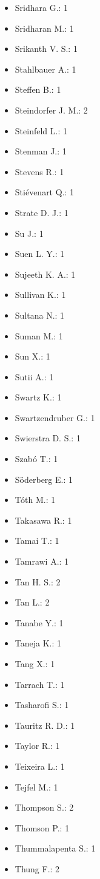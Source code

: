 \begin{itemize}
\item Sridhara G.: 1
\item Sridharan M.: 1
\item Srikanth V. S.: 1
\item Stahlbauer A.: 1
\item Steffen B.: 1
\item Steindorfer J. M.: 2
\item Steinfeld L.: 1
\item Stenman J.: 1
\item Stevens R.: 1
\item Stiévenart Q.: 1
\item Strate D. J.: 1
\item Su J.: 1
\item Suen L. Y.: 1
\item Sujeeth K. A.: 1
\item Sullivan K.: 1
\item Sultana N.: 1
\item Suman M.: 1
\item Sun X.: 1
\item Sutii A.: 1
\item Swartz K.: 1
\item Swartzendruber G.: 1
\item Swierstra D. S.: 1
\item Szabó T.: 1
\item Söderberg E.: 1
\item T\'{o}th M.: 1
\item Takasawa R.: 1
\item Tamai T.: 1
\item Tamrawi A.: 1
\item Tan H. S.: 2
\item Tan L.: 2
\item Tanabe Y.: 1
\item Taneja K.: 1
\item Tang X.: 1
\item Tarrach T.: 1
\item Tasharofi S.: 1
\item Tauritz R. D.: 1
\item Taylor R.: 1
\item Teixeira L.: 1
\item Tejfel M.: 1
\item Thompson S.: 2
\item Thomson P.: 1
\item Thummalapenta S.: 1
\item Thung F.: 2

\end{itemize}
